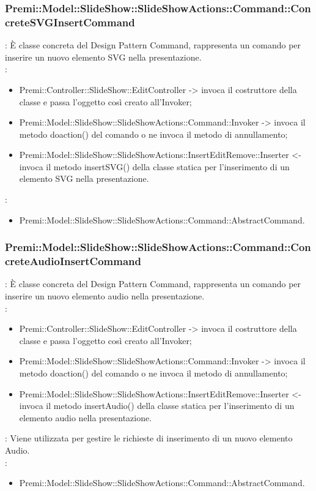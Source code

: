 {                    \subsubsection{Premi::Model::SlideShow::SlideShowActions::Command::ConcreteSVGInsertCommand}{
				\textbf{\tipo}: È classe concreta del Design Pattern Command, rappresenta un comando per inserire un nuovo elemento SVG nella presentazione.\\	
				\textbf{\relaz}: 
				\begin{itemize}
					\item Premi::Controller::SlideShow::EditController -> invoca il costruttore della classe e passa l’oggetto così creato all’Invoker;
					\item Premi::Model::SlideShow::SlideShowActions::Command::Invoker -> invoca il metodo doaction() del comando o ne invoca il metodo di annullamento;
                    \item Premi::Model::SlideShow::SlideShowActions::InsertEditRemove::Inserter <- invoca il metodo insertSVG() della classe statica per l’inserimento di un elemento SVG nella presentazione.
				\end{itemize}	
                \textbf{\base}: 
                    \begin{itemize}
                    \item Premi::Model::SlideShow::SlideShowActions::Command::AbstractCommand.
                    \end{itemize}
                    }
                \subsubsection{Premi::Model::SlideShow::SlideShowActions::Command::ConcreteAudioInsertCommand}{
				\textbf{\tipo}: È classe concreta del Design Pattern Command, rappresenta un comando per inserire un nuovo elemento audio nella presentazione.\\	
				\textbf{\relaz}: 
				\begin{itemize}
					\item Premi::Controller::SlideShow::EditController -> invoca il costruttore della classe e passa l’oggetto così creato all’Invoker;
					\item Premi::Model::SlideShow::SlideShowActions::Command::Invoker -> invoca il metodo doaction() del comando o ne invoca il metodo di annullamento;
                    \item Premi::Model::SlideShow::SlideShowActions::InsertEditRemove::Inserter <- invoca il metodo insertAudio() della classe statica per l’inserimento di un elemento audio nella presentazione.
				\end{itemize}	
                \textbf{\interfacce}: Viene utilizzata per gestire le richieste di inserimento di un nuovo elemento Audio.\\
                \textbf{\base}: 
                    \begin{itemize}
                    \item Premi::Model::SlideShow::SlideShowActions::Command::AbstractCommand.
                    \end{itemize}
                    }
}
